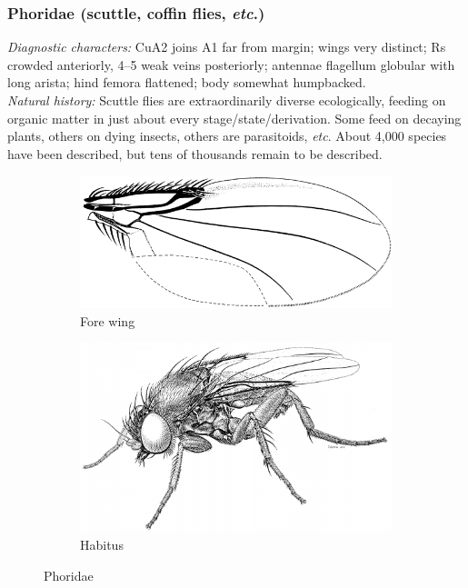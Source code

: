 \documentclass[letterpaper, 11pt]{article}
\begin{document}
\subsubsection{Phoridae (scuttle, coffin flies, \textit{etc}.)}
\noindent{}\textit{Diagnostic characters:} CuA2 joins A1 far from margin; wings very distinct; Rs crowded anteriorly, 4--5 weak veins posteriorly; antennae flagellum globular with long arista; hind femora flattened; body somewhat humpbacked.\\

\noindent{}\textit{Natural history:} Scuttle flies are extraordinarily diverse ecologically, feeding on organic matter in just about every stage/state/derivation. Some feed on decaying plants, others on dying insects, others are parasitoids, \textit{etc}. About 4,000 species have been described, but tens of thousands remain to be described.

\begin{figure}[ht!]
    \centering
    \begin{subfigure}[ht!]{0.45\textwidth}
        \includegraphics[width=\textwidth]{PhoridWing}
        \caption{Fore wing \citep[][Fig. 51.44]{mcalpine1981manualv2}}
        \label{fig:phorid1}
    \end{subfigure}
    \qquad
    \begin{subfigure}[ht!]{0.45\textwidth}
        \includegraphics[width=\textwidth]{PhoridHabitus}
        \caption{Habitus \citep[][Fig. 51.1]{mcalpine1981manualv2}}
        \label{fig:phorid2}
    \end{subfigure}
    \caption{Phoridae}\label{fig:phorids}
\end{figure}
\end{document}
